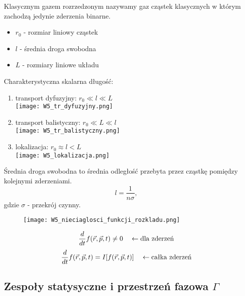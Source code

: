 Klasycznym gazem rozrzedzonym nazywamy gaz cząstek klasycznych w którym zachodzą jedynie zderzenia binarne.
\begin{itemize}
\item[] $r_0$ - rozmiar liniowy cząstek
\item[] $l$ - średnia droga swobodna
\item[] $L$ - rozmiary liniowe układu
\end{itemize}
Charakterystyczna skalarna długość:
\begin{enumerate}
\item transport dyfuzyjny: $r_0 \ll l \ll L$\\
\texttt{[image: W5\_tr\_dyfuzyjny.png]}
\item transport balistyczny: $r_0 \ll L \ll l$\\
\texttt{[image: W5\_tr\_balistyczny.png]}
\item lokalizacja: $r_0 \approx l < L$\\
\texttt{[image: W5\_lokalizacja.png]}
\end{enumerate}
Średnia droga swobodna to średnia odległość przebyta przez cząstkę pomiędzy kolejnymi zderzeniami.
\begin{equation}
l=\dfrac{1}{n\sigma},
\end{equation}
gdzie $\sigma$ - przekrój czynny.
\begin{figure}[h!]
\texttt{[image: W5\_nieciaglosci\_funkcji\_rozkladu.png]}
\end{figure}
$$\dfrac{d}{dt} f(\vec{r},\vec{p},t) \neq 0 \quad \leftarrow \mbox{dla zderzeń}$$
$$\dfrac{d}{dt} f(\vec{r},\vec{p},t) = I[f(\vec{r},\vec{p},t)]\quad \leftarrow \mbox{całka zderzeń}$$
\subsection{Zespoły statysyczne i przestrzeń fazowa $\Gamma$}

